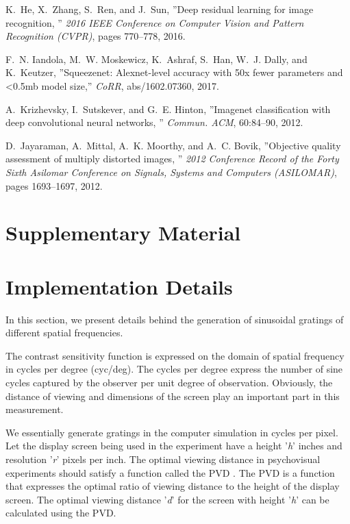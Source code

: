 \documentclass[10pt,twocolumn,letterpaper]{article}
\begin{document}
{\begin{thebibliography}{10}
K.~He, X.~Zhang, S.~Ren, and J.~Sun, ''Deep residual learning for image recognition, '' \emph{2016 IEEE     Conference on Computer Vision and Pattern Recognition
  (CVPR)}, pages 770--778, 2016.

F.~N. Iandola, M.~W. Moskewicz, K.~Ashraf, S.~Han, W.~J. Dally, and K.~Keutzer, ''Squeezenet:          Alexnet-level accuracy with 50x fewer parameters and
 <0.5mb model size,'' \emph{CoRR}, abs/1602.07360, 2017.
 
A.~Krizhevsky, I.~Sutskever, and G.~E. Hinton, ''Imagenet classification with deep convolutional neural networks, '' \emph{Commun. ACM}, 60:84--90, 2012.

D.~Jayaraman, A.~Mittal, A.~K. Moorthy, and A.~C. Bovik, ''Objective quality assessment of multiply distorted images, '' \emph{2012 Conference Record of the Forty Sixth Asilomar Conference on
  Signals, Systems and Computers (ASILOMAR)}, pages 1693--1697, 2012.

\end{thebibliography}}

\appendix
\section{Supplementary Material}
\section{Implementation Details}
In this section, we present details behind the generation of sinusoidal gratings of different spatial frequencies. 

The contrast sensitivity function is expressed on the domain of spatial frequency in cycles per degree (cyc/deg). The cycles per degree express the number of sine cycles captured by the observer per unit degree of observation. Obviously, the distance of viewing and dimensions of the screen play an important part in this measurement. 

We essentially generate gratings in the computer simulation in cycles per pixel. Let the display screen being used in the experiment have a height '\textit{h}' inches and resolution '\textit{r}' pixels per inch. The optimal viewing distance in psychovisual experiments should satisfy a function called the PVD \cite{1}. The PVD is a function that expresses the optimal ratio of viewing distance to the height of the display screen. The optimal viewing distance '\textit{d}' for the screen with height '\textit{h}' can be calculated using the PVD. 
\end{document}

